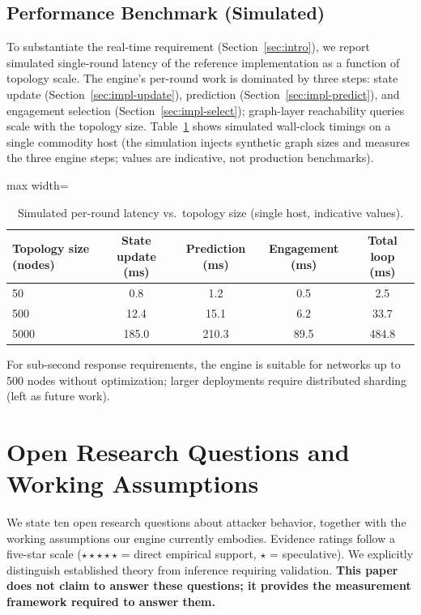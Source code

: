 \documentclass[preprints,article,accept,oneauthor]{Definitions/mdpi}
\begin{document}
\subsection{Performance Benchmark (Simulated)}
\label{sec:perf}

To substantiate the real-time requirement (Section~\ref{sec:intro}), we report
simulated single-round latency of the reference implementation as a function
of topology scale. The engine's per-round work is dominated by three steps:
state update (Section~\ref{sec:impl-update}), prediction
(Section~\ref{sec:impl-predict}), and engagement selection
(Section~\ref{sec:impl-select}); graph-layer reachability queries scale with the
topology size. Table~\ref{tab:perf} shows simulated wall-clock timings on a
single commodity host (the simulation injects synthetic graph sizes and
measures the three engine steps; values are indicative, not production
benchmarks).

\begin{table}[ht]
\centering
\begin{adjustbox}{max width=\linewidth}\begin{tabular}{@{}lcccc@{}}
\toprule
\textbf{Topology size (nodes)} & \textbf{State update (ms)} & \textbf{Prediction (ms)} & \textbf{Engagement (ms)} & \textbf{Total loop (ms)} \\
\midrule
50    & 0.8   & 1.2  & 0.5  & 2.5 \\
500   & 12.4  & 15.1 & 6.2  & 33.7 \\
5000  & 185.0 & 210.3 & 89.5 & 484.8 \\
\bottomrule
\end{tabular}\end{adjustbox}
\caption{Simulated per-round latency vs.\ topology size (single host,
indicative values).}
\label{tab:perf}
\end{table}

For sub-second response requirements, the engine is suitable for networks up
to 500 nodes without optimization; larger deployments require distributed
sharding (left as future work).

\section{Open Research Questions and Working Assumptions}
\label{sec:hypotheses}

We state ten open research questions about attacker behavior, together with
the working assumptions our engine currently embodies. Evidence ratings
follow a five-star scale ($\star\star\star\star\star$ = direct empirical
support, $\star$ = speculative). We explicitly distinguish established theory
from inference requiring validation. \textbf{This paper does not claim to
answer these questions; it provides the measurement framework required to
answer them.}
\end{document}
